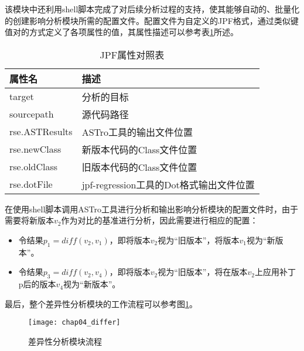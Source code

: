 该模块中还利用shell脚本完成了对后续分析过程的支持，使其能够自动的、批量化的创建影响分析模块所需的配置文件。配置文件为自定义的JPF格式，通过类似键值对的方式定义了各项属性的值，其属性描述可以参考表\ref {JPF_prop}所述。

\begin{table}[H]
	\caption{JPF属性对照表}
	\label{JPF_prop}
	\centering
	\begin{tabular*}{\linewidth}{lp{10cm}}
		\toprule[1.5pt]
		{\heiti 属性名} & {\heiti 描述} \\\midrule[1pt]
		target & 分析的目标 \\
		sourcepath & 源代码路径\\
		rse.ASTResults & ASTro工具的输出文件位置\\
		rse.newClass & 新版本代码的Class文件位置\\
		rse.oldClass    & 旧版本代码的Class文件位置\\
		rse.dotFile   & jpf-regression工具的Dot格式输出文件位置\\
		\bottomrule[1.5pt]
	\end{tabular*}
\end{table}

在使用shell脚本调用ASTro工具进行分析和输出影响分析模块的配置文件时，由于需要将新版本$v_2$作为对比的基准进行分析，因此需要进行相应的配置：
\begin{itemize}
	\item 令结果$p_1 = diff(v_2,v_1)$，即将版本$v_2$视为“旧版本”，将版本$v_1$视为“新版本”。
	\item 令结果$p_3 = diff(v_2,v_4)$，即将版本$v_2$视为“旧版本”，将在版本$v_2$上应用补丁p后的版本$v_4$视为“新版本”。
\end{itemize}

最后，整个差异性分析模块的工作流程可以参考图\ref {sec_diff}。

\begin{figure}[H]
	\centering
	\texttt{[image: chap04\_differ]}
	\caption {差异性分析模块流程}
	\label {sec_diff}	
\end{figure}



